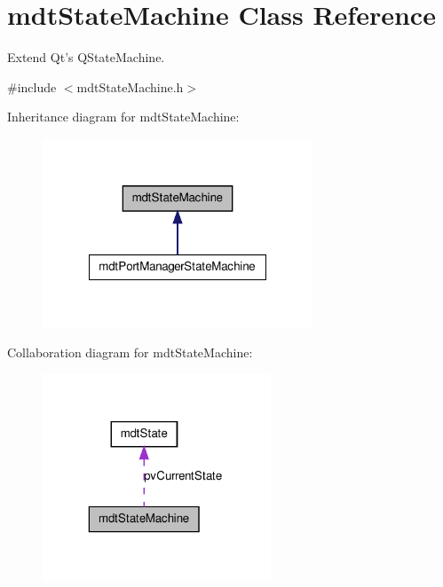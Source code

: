 \hypertarget{classmdt_state_machine}{
\section{mdtStateMachine Class Reference}
\label{classmdt_state_machine}
}


Extend Qt's QStateMachine.  




{\ttfamily \#include $<$mdtStateMachine.h$>$}



Inheritance diagram for mdtStateMachine:
\nopagebreak
\begin{figure}[H]
\begin{center}
\leavevmode
\includegraphics[width=228pt]{classmdt_state_machine__inherit__graph}
\end{center}
\end{figure}


Collaboration diagram for mdtStateMachine:
\nopagebreak
\begin{figure}[H]
\begin{center}
\leavevmode
\includegraphics[width=193pt]{classmdt_state_machine__coll__graph}
\end{center}
\end{figure}
